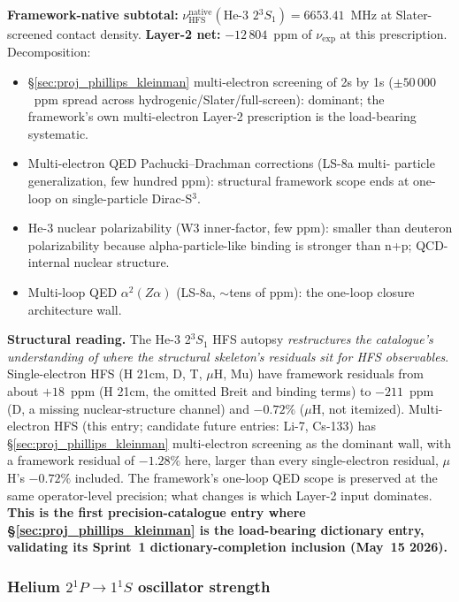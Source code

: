 \documentclass[11pt]{article}
\begin{document}
\textbf{Framework-native subtotal:} $\nu_\text{HFS}^\text{native}
(\text{He-3 } 2{}^3\!S_1) = 6653.41$~MHz at Slater-screened contact
density. \textbf{Layer-2 net:} $-12\,804$~ppm of $\nu_\text{exp}$ at
this prescription. Decomposition:
\begin{itemize}\setlength\itemsep{0pt}
\item \S\ref{sec:proj_phillips_kleinman} multi-electron screening of
2s by 1s ($\pm 50\,000$~ppm spread across hydrogenic/Slater/full-screen):
dominant; the framework's own multi-electron Layer-2 prescription is
the load-bearing systematic.
\item Multi-electron QED Pachucki--Drachman corrections (LS-8a multi-
particle generalization, few hundred ppm): structural framework scope
ends at one-loop on single-particle Dirac-S$^3$.
\item He-3 nuclear polarizability (W3 inner-factor, few ppm): smaller
than deuteron polarizability because alpha-particle-like binding is
stronger than n+p; QCD-internal nuclear structure.
\item Multi-loop QED $\alpha^2(Z\alpha)$ (LS-8a, $\sim$tens of ppm):
the one-loop closure architecture wall.
\end{itemize}

\textbf{Structural reading.} The He-3 2$^3\!S_1$ HFS autopsy
\emph{restructures the catalogue's understanding of where the structural
skeleton's residuals sit for HFS observables}. Single-electron HFS
(H 21cm, D, T, $\mu$H, Mu) have framework residuals from about
$+18$~ppm (H 21cm, the omitted Breit and binding terms) to $-211$~ppm
(D, a missing nuclear-structure channel) and $-0.72\%$ ($\mu$H, not
itemized). Multi-electron HFS (this entry;
candidate future entries: Li-7, Cs-133) has
\S\ref{sec:proj_phillips_kleinman} multi-electron screening as the
dominant wall, with a framework residual of $-1.28\%$ here, larger than
every single-electron residual, $\mu$H's $-0.72\%$ included. The framework's one-loop QED scope is preserved at
the same operator-level precision; what changes is which Layer-2 input
dominates. \textbf{This is the first precision-catalogue entry where
\S\ref{sec:proj_phillips_kleinman} is the load-bearing dictionary
entry, validating its Sprint~1 dictionary-completion inclusion
(May~15 2026).}

\subsubsection{Helium $2{}^1\!P \to 1{}^1\!S$ oscillator strength}
\label{sec:autopsy_he_oscillator}
\end{document}
